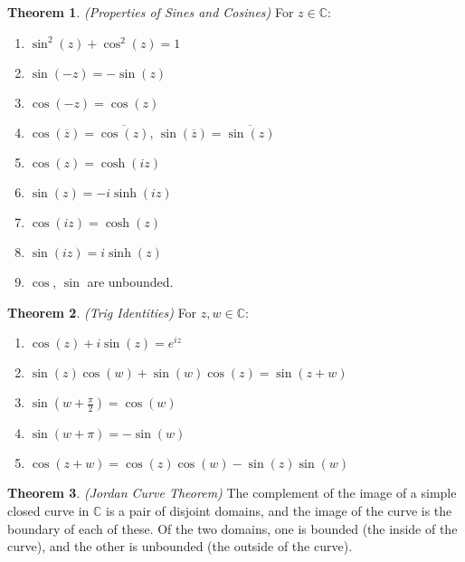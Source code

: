 \documentclass[a4paper]{article}
\theoremstyle{definition}
\newtheorem{theorem}{Theorem}
\begin{document}
	\begin{theorem}
		\emph{(Properties of Sines and Cosines)}
		For $z \in \mathbb{C}$:
		\begin{enumerate}[label=\alph*.]
			\item $\sin^{2}{(z)} + \cos^{2}{(z)} = 1$
			\item $\sin{(-z)} = -\sin{(z)}$
			\item $\cos{(-z)} = \cos{(z)}$
			\item $\cos{(\overline{z})} = \overline{\cos{(z)}}$, $\sin{(\overline{z})} = \overline{\sin{(z)}}$
			\item $\cos{(z)} = \cosh{(i z)}$
			\item $\sin{(z)} = -i\sinh{(i z)}$
			\item $\cos{(i z)} = \cosh{(z)}$
			\item $\sin{(i z)} = i \sinh{(z)}$
			\item $\cos$, $\sin$ are unbounded.
		\end{enumerate}
	\end{theorem}
	
	\begin{theorem}
		\emph{(Trig Identities)}
		For $z, w \in \mathbb{C}$:
		\begin{enumerate}[label=\alph*.]
			\item $\cos{(z)} + i \sin{(z)} = e^{i z}$
			\item $\sin{(z)}\cos{(w)} + \sin{(w)}\cos{(z)} = \sin{(z + w)}$
			\item $\sin{(w + \frac{\pi}{2})} = \cos{(w)}$
			\item $\sin{(w + \pi)} = -\sin{(w)}$
			\item $\cos{(z + w)} = \cos{(z)}\cos{(w)} - \sin{(z)}\sin{(w)}$
		\end{enumerate}
	\end{theorem}
	
	\begin{theorem}
		\emph{(Jordan Curve Theorem)}
		The complement of the image of a simple closed curve in $\mathbb{C}$ is a pair of disjoint domains, and the image of the curve is the boundary of each of these. Of the two domains, one is bounded (the
		inside of the curve), and the other is unbounded (the outside of the curve).
	\end{theorem}
	
\end{document}
